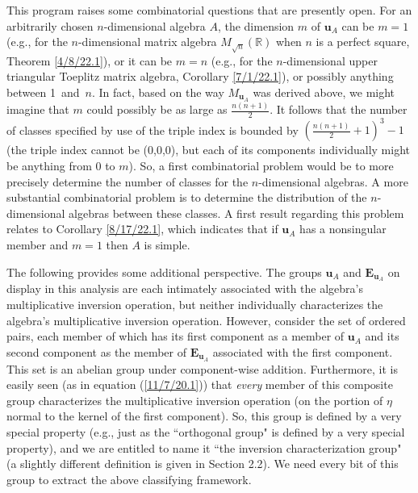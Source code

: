 \documentclass{amsart}
\numberwithin{equation}{section}
\theoremstyle{definition}
\numberwithin{theorem}{section}
\begin{document}
This program  raises some combinatorial questions that are presently open.  For an arbitrarily chosen \mbox{$n$-dimensional} algebra $A$, the dimension $m$ of $\mathbf{u}_A$ can be $m=1$ (e.g., for the $n$-dimensional matrix algebra $M_{\sqrt{n}}(\mathbb{R})$ when $n$ is a perfect square, Theorem \ref{4/8/22.1}), or it can be  $m=n$ (e.g., for the $n$-dimensional upper triangular Toeplitz matrix algebra, Corollary \ref{7/1/22.1}), or possibly anything between \mbox{1 and $n$}.  In fact, based on the way $M_{\mathbf{u}_A}$ was derived above, we might imagine that $m$ could possibly be as large as $\frac{n(n+1)}{2}$.  It follows that the number of classes specified by use of the triple index is bounded by $(\frac{n(n+1)}{2}+1)^3-1$ (the triple index cannot be (0,0,0), but each of its components individually might be anything from $0$ to $m$).  So, a first combinatorial problem would be to more precisely determine the number of classes for the $n$-dimensional algebras.    A more substantial combinatorial problem is to determine the distribution of the $n$-dimensional algebras between these classes.  A first result regarding this problem relates to Corollary \ref{8/17/22.1}, which indicates that if $\mathbf{u}_A$ has a nonsingular member and $m=1$ then $A$ is simple.   
  
   The following provides some additional perspective. The groups $\mathbf{u}_A$ and $\mathbf{E}_{\mathbf{u}_A}$ on display in this analysis are each intimately associated with the algebra's multiplicative inversion operation, but neither individually characterizes the algebra's multiplicative inversion operation.  However, consider the set of ordered pairs, each member of which has its first component as a member of $\mathbf{u}_A$ and its second component as the member of $\mathbf{E}_{\mathbf{u}_A}$ associated with the first component.  This set is an abelian group under component-wise addition.  Furthermore, it is easily seen (as in equation (\ref{11/7/20.1})) that {\it every} member of this composite group characterizes the multiplicative inversion operation (on the portion of $\eta$ normal to the kernel of the first component).  So, this group is defined by a very special property (e.g., just as the ``orthogonal group" is defined by a very special property), and we are entitled to name it ``the inversion characterization group" (a slightly different definition is given in Section 2.2).   We need every bit of this group to extract the above classifying framework.
 
\end{document}
